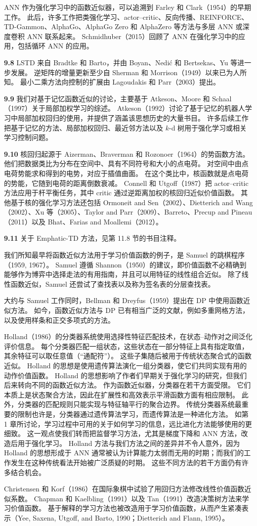\documentclass[UTF8,12pt,a4paper,fontset=fandol]{ctexart}
\begin{document}
ANN 作为强化学习中的函数近似器，可以追溯到 Farley 和 Clark（1954）的早期工作。
此后，许多工作把类强化学习、actor--critic、反向传播、REINFORCE、TD-Gammon、AlphaGo、AlphaGo Zero 和 AlphaZero 等方法与多层 ANN 或深度卷积 ANN 联系起来。
Schmidhuber（2015）回顾了 ANN 在强化学习中的应用，包括循环 ANN 的应用。

\noindent\textbf{9.8}
LSTD 来自 Bradtke 和 Barto，并由 Boyan、Nedić 和 Bertsekas、Yu 等进一步发展。
逆矩阵的增量更新至少自 Sherman 和 Morrison（1949）以来已为人所知。
最小二乘方法向控制的扩展由 Lagoudakis 和 Parr（2003）提出。

\noindent\textbf{9.9}
我们对基于记忆函数近似的讨论，主要基于 Atkeson、Moore 和 Schaal（1997）关于局部加权学习的综述。
Atkeson（1992）讨论了基于记忆的机器人学习中局部加权回归的使用，并提供了涵盖该思想历史的大量书目。
许多后续工作把基于记忆的方法、局部加权回归、最近邻方法以及 $k$-d 树用于强化学习或相关学习控制问题。

\noindent\textbf{9.10}
核回归起源于 Aizerman、Braverman 和 Rozonoer（1964）的势函数方法。
他们把数据类比为分布在空间中、具有不同符号和大小的点电荷。
对空间中由点电荷势能求和得到的电势，对应于插值曲面。
在这个类比中，核函数就是点电荷的势能，它随到电荷的距离倒数衰减。
Connell 和 Utgoff（1987）把 actor--critic 方法应用于杆平衡任务，其中 critic 通过逆距离加权的核回归近似价值函数。
其他基于核的强化学习方法还包括 Ormoneit and Sen（2002）、Dietterich and Wang（2002）、Xu 等（2005）、Taylor and Parr（2009）、Barreto、Precup and Pineau（2011）以及 Bhat、Farias and Moallemi（2012）。

\noindent\textbf{9.11}
关于 Emphatic-TD 方法，见第 11.8 节的书目注释。

我们所知最早将函数近似方法用于学习价值函数的例子，是 Samuel 的跳棋程序（1959, 1967）。
Samuel 遵循 Shannon（1950）的建议，即价值函数不必精确到能够作为博弈中选择走法的有用指南，并且可以用特征的线性组合近似。
除了线性函数近似，Samuel 还尝试了查找表以及称为签名表的分层查找表。

大约与 Samuel 工作同时，Bellman 和 Dreyfus（1959）提出在 DP 中使用函数近似方法。
如今，函数近似方法与 DP 已有相当广泛的文献，例如多重网格方法，以及使用样条和正交多项式的方法。

Holland（1986）的分类器系统使用选择性特征匹配技术，在状态--动作对之间泛化评价信息。
每个分类器匹配一组状态，这些状态在一部分特征上具有指定取值，其余特征可以取任意值（“通配符”）。
这些子集随后被用于传统状态聚合式的函数近似。
Holland 的思想是使用遗传算法演化一组分类器，使它们共同实现有用的动作价值函数。
Holland 的思想影响了作者们早期关于强化学习的研究，但我们后来转向不同的函数近似方法。
作为函数近似器，分类器在若干方面受限。
它们本质上是状态聚合方法，因此在扩展性和高效表示平滑函数方面有相应限制。
此外，分类器的匹配规则只能实现与特征轴平行的聚合边界。
传统分类器系统最重要的限制也许是，分类器通过遗传算法学习，而遗传算法是一种进化方法。
如第 1 章所讨论，学习过程中可用的关于如何学习的信息，远比进化方法能够使用的更细致。
这一观点使我们转而把监督学习方法，尤其是梯度下降和 ANN 方法，改造后用于强化学习。
Holland 方法与我们方法之间的差异并不令人意外，因为 Holland 的思想形成于 ANN 通常被认为计算能力太弱而无用的时期；而我们的工作发生在这种传统看法开始被广泛质疑的时期。
这些不同方法的若干方面仍有许多结合机会。

Christensen 和 Korf（1986）在国际象棋中试验了用回归方法修改线性价值函数近似系数。
Chapman 和 Kaelbling（1991）以及 Tan（1991）改造决策树方法来学习价值函数。
基于解释的学习方法也被改造用于学习价值函数，从而产生紧凑表示（Yee, Saxena, Utgoff, and Barto, 1990；Dietterich and Flann, 1995）。
\end{document}
